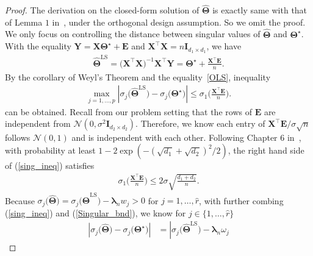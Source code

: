 \documentclass[alpha-refs]{wiley-article}
\begin{document}
\begin{proof}
The derivation on the closed-form solution of $\widehat{\boldsymbol{\Theta}}$ is exactly same with that of Lemma $1$ in~\citet{yuan2007dimension}, under the orthogonal design assumption.
So we omit the proof.
We only focus on controlling the distance between singular values of $\widehat{\boldsymbol{\Theta}}$ and $\boldsymbol{\Theta}^{\star}$.
With the equality $\boldsymbol{Y}=\boldsymbol{X}\boldsymbol{\Theta}^{\star}+\boldsymbol{E}$ and $\boldsymbol{X}^{\top}\boldsymbol{X}=n\boldsymbol{I}_{d_{1} \times d_{1}}$, we have
\begin{align} \label{OLS}
    \widehat{\boldsymbol{\Theta}}^{\text{LS}}=\big(\boldsymbol{X}^{\top}\boldsymbol{X}\big)^{-1}\boldsymbol{X}^{\top}\boldsymbol{Y} = \boldsymbol{\Theta^\star} + \frac{\boldsymbol{X}^{\top}\boldsymbol{E}}{n}.
\end{align}
By the corollary of Weyl's Theorem and the equality~\eqref{OLS}, inequality
\begin{align} \label{sing_ineq}
    \max_{j=1,\dots,p}\left| \sigma_{j}\big(\widehat{\boldsymbol{\Theta}}^{\text{LS}}\big) - \sigma_{j}\big(\boldsymbol{\Theta^\star}\big) \right|
    \leq \sigma_{1}\bigg( \frac{\boldsymbol{X}^{\top}\boldsymbol{E}}{n} \bigg).
\end{align}
can be obtained. Recall from our problem setting that the rows of $\boldsymbol{E}$ are independent from $\mathcal{N}(0,\sigma^{2}\boldsymbol{I}_{d_{2} \times d_{2}})$.
Therefore, we know each entry of $\boldsymbol{X}^{\top}\boldsymbol{E}/\sigma\sqrt{n}$ follows $\mathcal{N}(0,1)$ and is independent with each other.
Following Chapter $6$ in~\cite{wainwright2019high},
with probability at least $1-2\exp(-(\sqrt{d_{1}}+\sqrt{d_{2}})^{2}/2)$, the right hand side of (\ref{sing_ineq}) satisfies
\begin{align} \label{Singular_bnd}
    \sigma_{1}\bigg( \frac{\boldsymbol{X}^{\top}\boldsymbol{E}}{n} \bigg) \leq 2\sigma \sqrt{\frac{d_{1}+d_{2}}{n}} .
\end{align}
Because $\sigma_{j}\big(\widehat{\boldsymbol{\Theta}}\big) = \sigma_{j}\big(\widehat{\boldsymbol{\Theta}}^{\text{LS}}\big)-\boldsymbol{\lambda}_{n} w_{j}>0$ for $j=1,\dots,\widehat{r}$, with further combing (\ref{sing_ineq}) and (\ref{Singular_bnd}), we know  for $j\in\{1,\dots,\widehat{r}\}$
\begin{align}
    \left| \sigma_{j}\big(\widehat{\boldsymbol{\Theta}}\big)-\sigma_{j}\big(\boldsymbol{\Theta}^{\star}\big)\right|
    &= \left|\sigma_{j}\big(\widehat{\boldsymbol{\Theta}}^{\text{LS}}\big)-\boldsymbol{\lambda}_{n}\omega_{j}

\end{align}
\end{proof}
\end{document}

